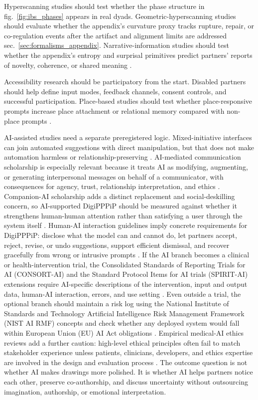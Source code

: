 \documentclass[
  english,
]{article}
\begin{document}
Hyperscanning studies should test whether the phase structure in
fig.~\ref{fig:ibs_phases} appears in real dyads. Geometric-hyperscanning
studies should evaluate whether the appendix's curvature proxy tracks
rupture, repair, or co-regulation events after the artifact and
alignment limits are addressed sec.~\ref{sec:formalisms_appendix}.
Narrative-information studies should test whether the appendix's entropy
and surprisal primitives predict partners' reports of novelty,
coherence, or shared meaning \citep{schulz2024narrativeinfo}.

Accessibility research should be participatory from the start. Disabled
partners should help define input modes, feedback channels, consent
controls, and successful participation. Place-based studies should test
whether place-responsive prompts increase place attachment or relational
memory compared with non-place prompts \citep{lewicka2011place}.

AI-assisted studies need a separate preregistered logic.
Mixed-initiative interfaces can join automated suggestions with direct
manipulation, but that does not make automation harmless or
relationship-preserving
\citep{horvitz1999mixedinitiative, deterding2017mixedinitiative}.
AI-mediated communication scholarship is especially relevant because it
treats AI as modifying, augmenting, or generating interpersonal messages
on behalf of a communicator, with consequences for agency, trust,
relationship interpretation, and ethics
\citep{hancock2020aimediatedcommunication}. Companion-AI scholarship
adds a distinct replacement and social-deskilling concern, so
AI-supported DigiPPPiP should be measured against whether it strengthens
human-human attention rather than satisfying a user through the system
itself \citep{malfacini2025companionai}. Human-AI interaction guidelines
imply concrete requirements for DigiPPPiP: disclose what the model can
and cannot do, let partners accept, reject, revise, or undo suggestions,
support efficient dismissal, and recover gracefully from wrong or
intrusive prompts \citep{amershi2019humanai}. If the AI branch becomes a
clinical or health-intervention trial, the Consolidated Standards of
Reporting Trials for AI (CONSORT-AI) and the Standard Protocol Items for
AI trials (SPIRIT-AI) extensions require AI-specific descriptions of the
intervention, input and output data, human-AI interaction, errors, and
use setting \citep{liu2020consortai, cruzrivera2020spiritai}. Even
outside a trial, the optional branch should maintain a risk log using
the National Institute of Standards and Technology Artificial
Intelligence Risk Management Framework (NIST AI RMF) concepts and check
whether any deployed system would fall within European Union (EU) AI Act
obligations \citep{nist2023airmf, europeanunion2024aiact}. Empirical
medical-AI ethics reviews add a further caution: high-level ethical
principles often fail to match stakeholder experience unless patients,
clinicians, developers, and ethics expertise are involved in the design
and evaluation process \citep{tang2023medicalaiethics}. The outcome
question is not whether AI makes drawings more polished. It is whether
AI helps partners notice each other, preserve co-authorship, and discuss
uncertainty without outsourcing imagination, authorship, or emotional
interpretation.
\end{document}
